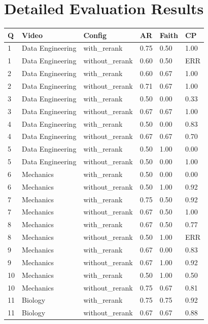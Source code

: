 \documentclass[12pt,a4paper,oneside]{report}
\begin{document}
\chapter{Detailed Evaluation Results}
\begin{longtable}{p{} p{} p{} p{} p{} p{}}
\toprule
\textbf{Q} & \textbf{Video} & \textbf{Config} & \textbf{AR} & \textbf{Faith} & \textbf{CP} \\
\midrule
1 & Data Engineering & with\_rerank & 0.75 & 0.50 & 1.00 \\
1 & Data Engineering & without\_rerank & 0.60 & 0.50 & ERR \\
2 & Data Engineering & with\_rerank & 0.60 & 0.67 & 1.00 \\
2 & Data Engineering & without\_rerank & 0.71 & 0.67 & 1.00 \\
3 & Data Engineering & with\_rerank & 0.50 & 0.00 & 0.33 \\
3 & Data Engineering & without\_rerank & 0.67 & 0.67 & 1.00 \\
4 & Data Engineering & with\_rerank & 0.50 & 0.00 & 0.83 \\
4 & Data Engineering & without\_rerank & 0.67 & 0.67 & 0.70 \\
5 & Data Engineering & with\_rerank & 0.50 & 1.00 & 0.00 \\
5 & Data Engineering & without\_rerank & 0.50 & 0.00 & 1.00 \\
6 & Mechanics & with\_rerank & 0.50 & 0.00 & 0.00 \\
6 & Mechanics & without\_rerank & 0.50 & 1.00 & 0.92 \\
7 & Mechanics & with\_rerank & 0.75 & 0.50 & 0.92 \\
7 & Mechanics & without\_rerank & 0.67 & 0.50 & 1.00 \\
8 & Mechanics & with\_rerank & 0.67 & 0.50 & 0.77 \\
8 & Mechanics & without\_rerank & 0.50 & 1.00 & ERR \\
9 & Mechanics & with\_rerank & 0.67 & 0.00 & 0.83 \\
9 & Mechanics & without\_rerank & 0.67 & 1.00 & 0.92 \\
10 & Mechanics & with\_rerank & 0.50 & 1.00 & 0.50 \\
10 & Mechanics & without\_rerank & 0.75 & 0.67 & 0.81 \\
11 & Biology & with\_rerank & 0.75 & 0.75 & 0.92 \\
11 & Biology & without\_rerank & 0.67 & 0.67 & 0.88 \\

\end{longtable}
\end{document}
